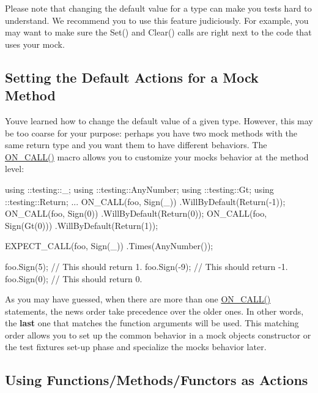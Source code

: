 Please note that changing the default value for a type can make you tests hard to understand. We recommend you to use this feature judiciously. For example, you may want to make sure the {\ttfamily Set()} and {\ttfamily Clear()} calls are right next to the code that uses your mock.

\subsection*{Setting the Default Actions for a Mock Method}

You\textquotesingle{}ve learned how to change the default value of a given type. However, this may be too coarse for your purpose\+: perhaps you have two mock methods with the same return type and you want them to have different behaviors. The {\ttfamily \hyperlink{gmock-spec-builders_8h_a5b12ae6cf84f0a544ca811b380c37334}{O\+N\+\_\+\+C\+A\+L\+L()}} macro allows you to customize your mock\textquotesingle{}s behavior at the method level\+:


\begin{DoxyCode}
using ::testing::\_;
using ::testing::AnyNumber;
using ::testing::Gt;
using ::testing::Return;
...
  ON\_CALL(foo, Sign(\_))
      .WillByDefault(Return(-1));
  ON\_CALL(foo, Sign(0))
      .WillByDefault(Return(0));
  ON\_CALL(foo, Sign(Gt(0)))
      .WillByDefault(Return(1));

  EXPECT\_CALL(foo, Sign(\_))
      .Times(AnyNumber());

  foo.Sign(5);   // This should return 1.
  foo.Sign(-9);  // This should return -1.
  foo.Sign(0);   // This should return 0.
\end{DoxyCode}


As you may have guessed, when there are more than one {\ttfamily \hyperlink{gmock-spec-builders_8h_a5b12ae6cf84f0a544ca811b380c37334}{O\+N\+\_\+\+C\+A\+L\+L()}} statements, the news order take precedence over the older ones. In other words, the {\bfseries last} one that matches the function arguments will be used. This matching order allows you to set up the common behavior in a mock object\textquotesingle{}s constructor or the test fixture\textquotesingle{}s set-\/up phase and specialize the mock\textquotesingle{}s behavior later.

\subsection*{Using Functions/\+Methods/\+Functors as Actions}

